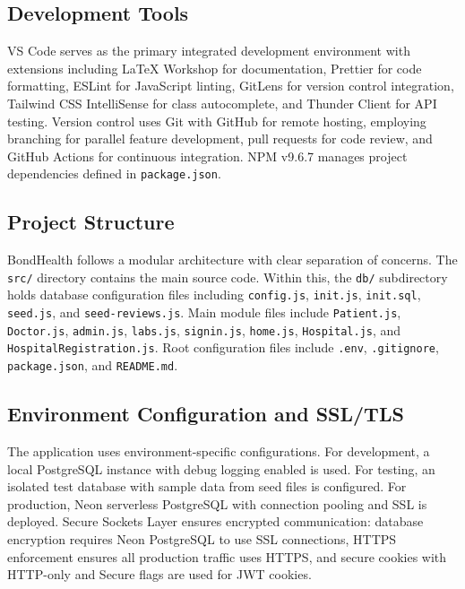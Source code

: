 \subsection{Development Tools}

\justifying
\noindent VS Code serves as the primary integrated development environment with extensions including LaTeX Workshop for documentation, Prettier for code formatting, ESLint for JavaScript linting, GitLens for version control integration, Tailwind CSS IntelliSense for class autocomplete, and Thunder Client for API testing. Version control uses Git with GitHub for remote hosting, employing branching for parallel feature development, pull requests for code review, and GitHub Actions for continuous integration. NPM v9.6.7 manages project dependencies defined in \texttt{package.json}.

\subsection{Project Structure}

\justifying
\noindent BondHealth follows a modular architecture with clear separation of concerns. The \texttt{src/} directory contains the main source code. Within this, the \texttt{db/} subdirectory holds database configuration files including \texttt{config.js}, \texttt{init.js}, \texttt{init.sql}, \texttt{seed.js}, and \texttt{seed-reviews.js}. Main module files include \texttt{Patient.js}, \texttt{Doctor.js}, \texttt{admin.js}, \texttt{labs.js}, \texttt{signin.js}, \texttt{home.js}, \texttt{Hospital.js}, and \texttt{HospitalRegistration.js}. Root configuration files include \texttt{.env}, \texttt{.gitignore}, \texttt{package.json}, and \texttt{README.md}.

\subsection{Environment Configuration and SSL/TLS}

\justifying
\noindent The application uses environment-specific configurations. For development, a local PostgreSQL instance with debug logging enabled is used. For testing, an isolated test database with sample data from seed files is configured. For production, Neon serverless PostgreSQL with connection pooling and SSL is deployed. Secure Sockets Layer ensures encrypted communication: database encryption requires Neon PostgreSQL to use SSL connections, HTTPS enforcement ensures all production traffic uses HTTPS, and secure cookies with HTTP-only and Secure flags are used for JWT cookies.

